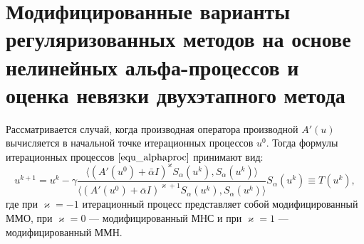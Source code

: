 \section{Модифицированные варианты регуляризованных методов на основе нелинейных альфа-процессов и оценка невязки двухэтапного метода}
Рассматривается случай, когда производная оператора производной $A'(u)$ вычисляется в начальной точке итерационных процессов $u^0$. Тогда формулы итерационных процессов $\eqref{equ_alphaproc}$ принимают вид:
\begin{equation}\label{modalphaproc}
u^{k+1}=u^k-\gamma\frac{\langle (A'(u^0)+\bar\alpha I)^{\varkappa}S_\alpha(u^k), S_\alpha(u^k)\rangle}{\langle (A'(u^0)+\bar\alpha I)^{\varkappa+1}S_\alpha(u^k), S_\alpha(u^k)\rangle}S_\alpha(u^k)\equiv T(u^k),
\end{equation}
где при $\varkappa=-1$ итерационный процесс представляет собой модифицированный ММО, при $\varkappa=0$ --- модифицированный МНС и при $\varkappa=1$ --- модифицированный ММН.


